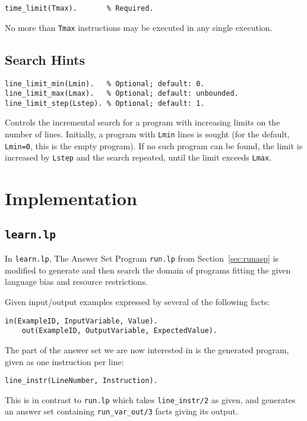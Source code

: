 \documentclass[a4paper,twoside,notitlepage]{report}
\newcommand{\ttt}{\texttt}
\begin{document}
\begin{Verbatim}[samepage=true]
time_limit(Tmax).       % Required.
\end{Verbatim}
No more than \ttt{Tmax} instructions may be executed in any single execution.

\subsection{Search Hints} \label{sec:synexm_spclng_hint}
\begin{Verbatim}[samepage=true]
line_limit_min(Lmin).   % Optional; default: 0.
line_limit_max(Lmax).   % Optional; default: unbounded.
line_limit_step(Lstep). % Optional; default: 1.
\end{Verbatim}
Controls the incremental search for a program with increasing limits on 
the number of lines. Initially, a program with \ttt{Lmin} lines is sought 
(for the default, \verb|Lmin=0|, this is the empty program). If no such 
program can be found, the limit is increased by \ttt{Lstep} and the search 
repeated, until the limit exceeds \ttt{Lmax}.

\section{Implementation}

\subsection{\ttt{learn.lp}}

In \verb|learn.lp|, The Answer Set Program \verb|run.lp| from 
Section~\ref{sec:runasp} is modified to generate and then search the 
domain of programs fitting the given language bias and resource 
restrictions.

Given input/output examples expressed by several of the following facts:
\begin{Verbatim}[samepage=true]
     in(ExampleID, InputVariable, Value).
    out(ExampleID, OutputVariable, ExpectedValue).
\end{Verbatim}
The part of the answer set we are now interested in is the generated 
program, given as one instruction per line:
\begin{Verbatim}[samepage=true]
    line_instr(LineNumber, Instruction).
\end{Verbatim}
This is in contrast to \verb|run.lp| which takes \verb|line_instr/2| as 
given, and generates an answer set containing \verb|run_var_out/3| facts 
giving its output.
\end{document}
